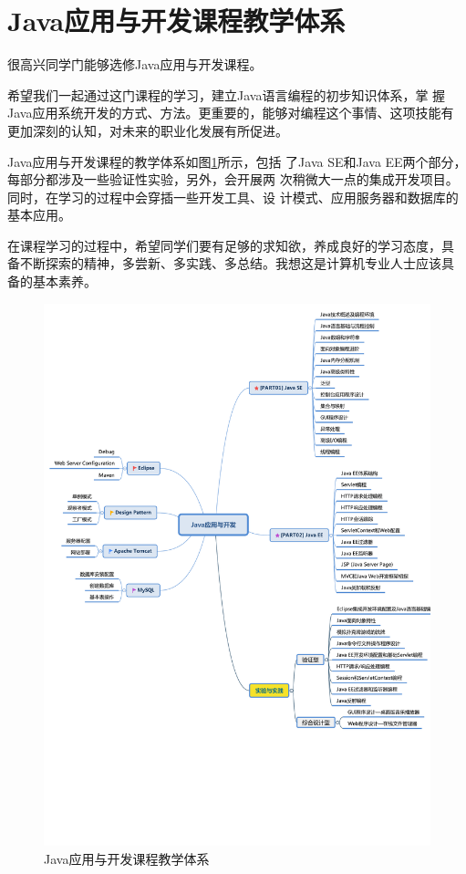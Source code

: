 \chapter*{Java应用与开发课程教学体系}

{\kai 很高兴同学门能够选修Java应用与开发课程。

希望我们一起通过这门课程的学习，建立Java语言编程的初步知识体系，掌
握Java应用系统开发的方式、方法。更重要的，能够对编程这个事情、这项技能有
更加深刻的认知，对未来的职业化发展有所促进。

Java应用与开发课程的教学体系如图\ref{fig:java-course-arch}所示，包括
了Java SE和Java EE两个部分，每部分都涉及一些验证性实验，另外，会开展两
次稍微大一点的集成开发项目。同时，在学习的过程中会穿插一些开发工具、设
计模式、应用服务器和数据库的基本应用。

在课程学习的过程中，希望同学们要有足够的求知欲，养成良好的学习态度，具
备不断探索的精神，多尝新、多实践、多总结。我想这是计算机专业人士应该具
备的基本素养。}

\begin{figure}[htb]
\centering
\includegraphics[width=\textwidth]{images/fig-java-course-arch.pdf}
\caption{Java应用与开发课程教学体系}
\label{fig:java-course-arch}
\end{figure}

